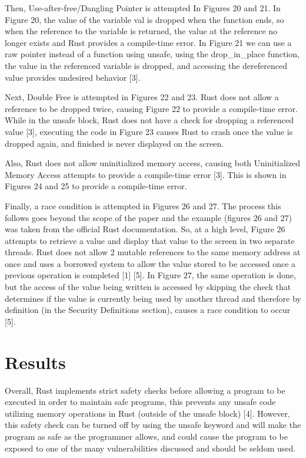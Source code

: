 \documentclass[sigconf,authorversion,nonacm]{acmart}
\begin{document}
Then, Use-after-free/Dangling Pointer is attempted In Figures 20 and 21. In Figure 20, the value of the variable val is dropped when the function ends, so when the reference to the variable is returned, the value at the reference no longer exists and Rust provides a compile-time error. In Figure 21 we can use a raw pointer instead of a function using unsafe, using the drop\_in\_place function, the value in the referenced variable is dropped, and accessing the dereferenced value provides undesired behavior [3].

Next, Double Free is attempted in Figures 22 and 23. Rust does not allow a reference to be dropped twice, causing Figure 22 to provide a compile-time error. While in the unsafe block, Rust does not have a check for dropping a referenced value [3], executing the code in Figure 23 causes Rust to crash once the value is dropped again, and finished is never displayed on the screen.

Also, Rust does not allow uninitialized memory access, causing both Uninitialized Memory Access attempts to provide a compile-time error [3]. This is shown in Figures 24 and 25 to provide a compile-time error.

Finally, a race condition is attempted in Figures 26 and 27. The process this follows goes beyond the scope of the paper and the example (figures 26 and 27) was taken from the official Rust documentation. So, at a high level, Figure 26 attempts to retrieve a value and display that value to the screen in two separate threads. Rust does not allow 2 mutable references to the same memory address at once and uses a borrowed system to allow the value stored to be accessed once a previous operation is completed [1] [5]. In Figure 27, the same operation is done, but the access of the value being written is accessed by skipping the check that determines if the value is currently being used by another thread and therefore by definition (in the Security Definitions section), causes a race condition to occur [5].  

\section*{Results}
Overall, Rust implements strict safety checks before allowing a program to be executed in order to maintain safe programs, this prevents any unsafe code utilizing memory operations in Rust (outside of the unsafe block) [4]. However, this safety check can be turned off by using the unsafe keyword and will make the program as safe as the programmer allows, and could cause the program to be exposed to one of the many vulnerabilities discussed and should be seldom used.
\end{document}
